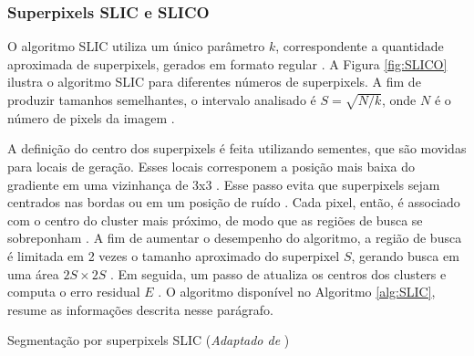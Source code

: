\begin{document}
\subsubsection{Superpixels SLIC e SLICO} \label{sssec:slic}

O algoritmo SLIC utiliza um único parâmetro $k$, correspondente a quantidade aproximada de superpixels, gerados em formato regular \cite{SLIC}. A Figura \ref{fig:SLICO} ilustra o algoritmo SLIC para diferentes números de superpixels. A fim de produzir tamanhos semelhantes, o intervalo analisado é \mbox{$S=\sqrt{N/k}$}, onde $N$ é o número de pixels da imagem \cite{SLIC}. 

A definição do centro dos superpixels é feita utilizando sementes, que são movidas para locais de geração. Esses locais corresponem a posição mais baixa do gradiente em uma vizinhança de 3x3 \cite{SLIC}. Esse passo evita que superpixels sejam centrados nas bordas ou em um posição de ruído \cite{SLIC}. Cada pixel, então, é associado com o centro do cluster mais próximo, de modo que as regiões de busca se sobreponham \cite{SLIC}. A fim de aumentar o desempenho do algoritmo, a região de busca é limitada em 2 vezes o tamanho aproximado do superpixel $S$, gerando busca em uma área $2S \times 2S$ \cite{SLIC}. Em seguida, um passo de atualiza os centros dos clusters e computa o erro residual $E$ \cite{SLIC}. O algoritmo disponível no Algoritmo \ref{alg:SLIC}, resume as informações descrita nesse parágrafo.

\begin{algorithm}
    \caption{Segmentação por superpixels SLIC (\textit{Adaptado de } \cite{SLIC})}
    \label{alg:SLIC}
    \begin{algorithmic}[1]
        \Repeat
                \EndIf
                \EndFor
            \EndFor    
    \end{algorithmic}
\end{algorithm}
\end{document}
